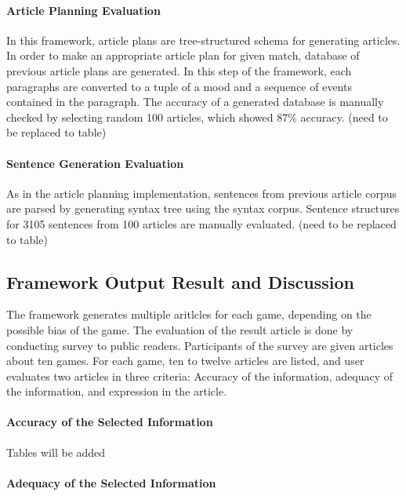 \documentclass[11pt,letterpaper]{article}
\begin{document}
\paragraph{Article Planning Evaluation}

In this framework, article plans are tree-structured schema for generating articles. In order to make an appropriate article plan for given match, database of previous article plans are generated. In this step of the framework, each paragraphs are converted to a tuple of a mood and a sequence of events contained in the paragraph. The accuracy of a generated database is manually checked by selecting random 100 articles, which showed 87\% accuracy. (need to be replaced to table)

\paragraph{Sentence Generation Evaluation} 

As in the article planning implementation, sentences from previous article corpus are parsed by generating syntax tree using the syntax corpus. Sentence structures for 3105 sentences from 100 articles are manually evaluated. (need to be replaced to table)


\subsection{Framework Output Result and Discussion}

The framework generates multiple aritlcles for each game, depending on the possible bias of the game. 
The evaluation of the result article is done by conducting survey to public readers. Participants of the survey are given articles about ten games. For each game, ten to twelve articles are listed, and user evaluates two articles in three criteria: Accuracy of the information, adequacy of the information, and expression in the article. 

\paragraph{Accuracy of the Selected Information}

Tables will be added

\paragraph{Adequacy of the Selected Information} 
\end{document}
